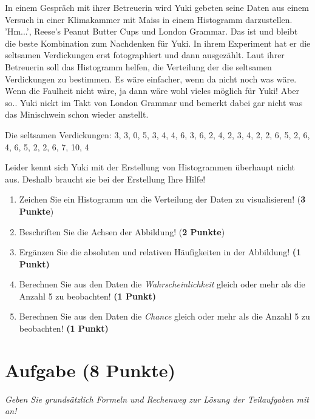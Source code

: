 \documentclass[a4paper, 9pt]{scrartcl}\usepackage[]{graphicx}\usepackage[]{xcolor}
\begin{document}
In einem Gespräch mit ihrer Betreuerin wird Yuki gebeten seine Daten aus einem Versuch in einer Klimakammer mit Maiss in einem Histogramm darzustellen. 'Hm...', Reese's Peanut Butter Cups und London Grammar. Das ist und bleibt die beste Kombination zum Nachdenken für Yuki. In ihrem Experiment hat er die seltsamen Verdickungen erst fotographiert und dann ausgezählt. Laut ihrer Betreuerin soll das Histogramm helfen, die Verteilung der die seltsamen Verdickungen zu bestimmen. Es wäre einfacher, wenn da nicht noch was wäre. Wenn die Faulheit nicht wäre, ja dann wäre wohl vieles möglich für Yuki! Aber so.. Yuki nickt im Takt von London Grammar und bemerkt dabei gar nicht was das Minischwein schon wieder anstellt.

\begin{center}
Die seltsamen Verdickungen: 3, 3, 0, 5, 3, 4, 4, 6, 3, 6, 2, 4, 2, 3, 4, 2, 2, 6, 5, 2, 6, 4, 6, 5, 2, 2, 6, 7, 10, 4
\end{center}

Leider kennt sich Yuki mit der Erstellung von Histogrammen überhaupt nicht aus. Deshalb braucht sie bei der Erstellung Ihre Hilfe!

\begin{enumerate}
\item Zeichen Sie ein Histogramm um die Verteilung der Daten zu visualisieren! (\textbf{3 Punkte})
\item Beschriften Sie die Achsen der Abbildung! (\textbf{2 Punkte})
\item Ergänzen Sie die absoluten und relativen Häufigkeiten in der
  Abbildung! \textbf{(1 Punkt)}
\item Berechnen Sie aus den Daten die \textit{Wahrscheinlichkeit}
  gleich oder mehr als die Anzahl 5 zu beobachten! \textbf{(1
    Punkt)}
\item Berechnen Sie aus den Daten die \textit{Chance} gleich oder mehr
  als die Anzahl 5 zu beobachten! \textbf{(1 Punkt)}
\end{enumerate}

 
\clearpage

\section{Aufgabe \hfill (8 Punkte)}

\textit{Geben Sie grundsätzlich Formeln und Rechenweg zur Lösung der Teilaufgaben mit an!} \\[1Ex]
 
\end{document}
